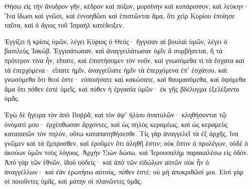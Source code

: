 {Θήσω εἰς τὴν ἄνυδρον γῆν, κέδρον καὶ πύξον, μυρσίνην καὶ κυπάρισσον, καὶ λεύκην·
Ἵνα ἴδωσι καὶ γνῶσι, καὶ ἐννοηθῶσι καὶ ἐπιστῶνται ἅμα, ὅτι χεὶρ Κυρίου ἐποίησε ταῦτα, καὶ ὁ ἅγιος τοῦ Ἰσραὴλ κατέδειξεν.
\par }{\PP {}Ἐγγίζει ἡ κρίσις ὑμῶν, λέγει Κύριος ὁ Θεός· ἤγγισαν αἱ βουλαὶ ὑμῶν, λέγει ὁ βασιλεὺς Ἰακώβ.
Ἐγγισάτωσαν, καὶ ἀναγγειλάτωσαν ὑμῖν ἃ συμβήσεται, ἢ τὰ πρότερον τίνα ἦν, εἴπατε, καὶ ἐπιστήσομεν τὸν νοῦν, καὶ γνωσόμεθα τί τὰ ἔσχατα καὶ τὰ ἐπερχόμενα·
εἴπατε ἡμῖν, ἀναγγείλατε ἡμῖν τὰ ἐπερχόμενα ἐπʼ ἐσχάτου, καὶ γνωσόμεθα ὅτι θεοί ἐστε· εὐποιήσατε καὶ κακώσατε, καὶ θαυμασόμεθα, καὶ ὀψόμεθα ἅμα
ὅτι πόθεν ἐστὲ ὑμεῖς, καὶ πόθεν ἡ ἐργασία ὑμῶν· ἐκ γῆς βδέλυγμα ἐξελέξαντο ὑμᾶς.
\par }{\PP {}Ἐγὼ δὲ ἤγειρα τὸν ἀπὸ Βοῤῥᾶ, καὶ τὸν ἀφʼ ἡλίου ἀνατολῶν· κληθήσονται τῷ ὀνόματί μου· ἐρχέσθωσαν ἄρχοντες, καὶ ὡς πηλὸς κεραμέως, καὶ ὡς κεραμεὺς καταπατῶν τὸν πηλὸν, οὕτω καταπατηθήσεσθε.
Τίς γὰρ ἀναγγελεῖ τὰ ἐξ ἀρχῆς, ἵνα γνῶμεν καὶ τὰ ἔμπροσθεν, καὶ ἐροῦμεν ὅτι ἀληθῆ ἐστιν; οὐκ ἔστιν ὁ προλέγων, οὐδὲ ὁ ἀκούων ὑμῶν τοὺς λόγους.
Ἀρχὴν Σιὼν δώσω, καὶ Ἱερουσαλὴμ παρακαλέσω εἰς ὁδόν.
Ἀπὸ γὰρ τῶν ἐθνῶν, ἰδοὺ οὐδείς· καὶ ἀπὸ τῶν εἰδώλων αὐτῶν οὐκ ἦν ὁ ἀναγγέλλων· καὶ ἐὰν ἐρωτήσω αὐτοὺς, πόθεν ἐστέ; οὐ μὴ ἀποκριθῶσί μοι.
Εἰσὶ γὰρ οἱ ποιοῦντες ὑμᾶς, καὶ μάτην οἱ πλανῶντες ὑμᾶς.

}
